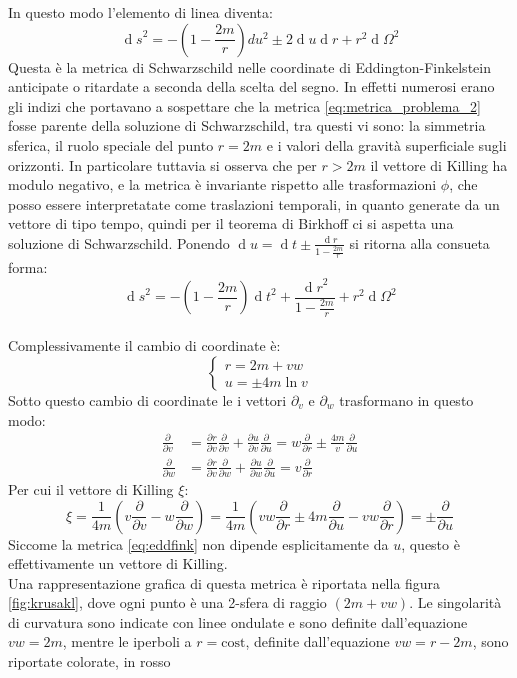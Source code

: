 \documentclass[]{scrartcl}
\newcommand{\pd}{\partial}
\newcommand{\pfrac}[1]{\frac{\partial}{\partial #1}}
\newcommand{\cost}{\mathrm{cost}}
\renewcommand{\d}[1]{\ensuremath{\operatorname{d}\!{#1}}}
\begin{document}
In questo modo l'elemento di linea diventa:
\begin{equation}
  \label{eq:eddfink}
  \d s^2 = - \left( 1 - \frac{2m}{r} \right) du^2 \pm 2\d u\d r  +  r^2 \d \Omega^2
\end{equation}
Questa è la metrica di Schwarzschild nelle coordinate di Eddington-Finkelstein anticipate o ritardate a seconda della scelta del segno.
In effetti numerosi erano gli indizi che portavano a sospettare che la metrica \eqref{eq:metrica_problema_2} fosse parente della soluzione di Schwarzschild,
tra questi vi sono: la simmetria sferica, il ruolo speciale del punto $ r = 2m $ e i valori della gravità superficiale sugli orizzonti. In particolare tuttavia si
osserva che per $ r > 2m $ il vettore di Killing ha modulo negativo, e la metrica è invariante rispetto alle trasformazioni $ \phi $, che posso essere interpretatate
come traslazioni temporali, in quanto generate da un vettore di tipo tempo,  quindi per il teorema di Birkhoff ci si aspetta una soluzione di Schwarzschild.
Ponendo $ \d u = \d t \pm \frac{\d r }{1 - \frac{2m}{r}} $ si ritorna alla consueta forma:
\[
  \d s^2 = - \left( 1 - \frac{2m}{r} \right) \d t^2 + \frac{\d r ^2}{1 - \frac{2m}{r}} + r^2 \d \Omega^2
\]
\\
Complessivamente il cambio di coordinate è:
\[
  \begin{cases}
    r = 2m + vw \\
    u = \pm 4m \ln v
  \end{cases}
\]
Sotto questo cambio di coordinate le i vettori $ \pd_v $ e $ \pd_w $ trasformano in questo modo:
\begin{align*}
  \pfrac{v} & = \frac{\pd r}{\pd v}\pfrac{v} +  \frac{\pd u}{\pd v}\pfrac{u} = w \pfrac{r} \pm \frac{4m}{v} \pfrac{u} \\
  \pfrac{w} & = \frac{\pd r}{\pd v}\pfrac{w} +  \frac{\pd u}{\pd w}\pfrac{u} = v\pfrac{r}
\end{align*}
Per cui il vettore di Killing $ \xi $:
\[
  \xi = \frac{1}{4 m} \left( v \pfrac{v} - w \pfrac{w} \right) = \frac{1}{4m} \left( vw \pfrac{r} \pm 4m \pfrac{u} - vw \pfrac{r} \right) = \pm \pfrac{u}
\]
Siccome la metrica \eqref{eq:eddfink} non dipende esplicitamente da $ u $, questo è effettivamente un vettore di Killing.
\\
Una rappresentazione grafica di questa metrica è riportata nella figura \ref{fig:krusakl}, dove ogni punto è una 2-sfera di raggio $ (2m + vw) $.
Le singolarità di curvatura sono indicate con linee ondulate e sono definite
dall'equazione $ vw = 2m $, mentre le iperboli a $ r = \cost $, definite dall'equazione $ vw = r - 2m $, sono riportate colorate, in rosso
\end{document}
